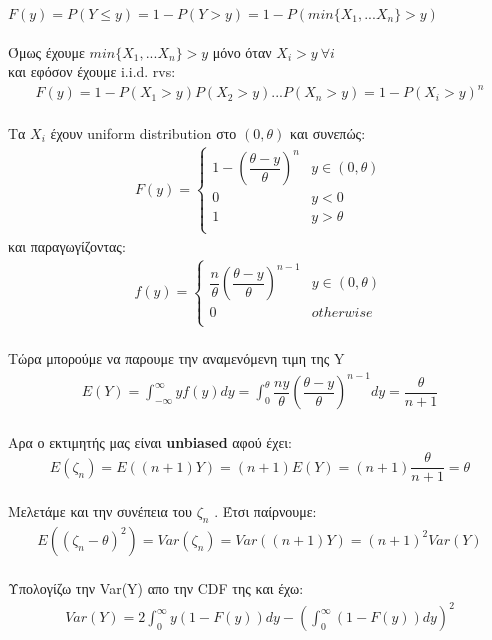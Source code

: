 \documentclass{article}
\begin{document}
$F(y)=P(Y\leq y)=1-P(Y>y)=1-P(min\lbrace X_{1},...X_{n} \rbrace > y)$
\\
\\
Όμως έχουμε $min\lbrace X_{1},...X_{n} \rbrace > y$ μόνο όταν $X_{i}>y ~ \forall i$ \\
και εφόσον έχουμε i.i.d. rvs:
\begin{align*}
F(y)=1-P(X_{1}>y)P(X_{2}>y)...P(X_{n}>y)=1-P(X_{i}>y)^{n}
\end{align*}
\\
Τα $X_{i}$ έχουν uniform distribution στο $(0,\theta)$ και συνεπώς:\\
\begin{align*}
F(y)=\left\{
\begin{array}{ll}
      1-\left(\dfrac{\theta-y}{\theta}\right)^{n} & y\in (0,\theta) \\
      0 & y<0\\
      1 & y>\theta\\
\end{array} 
\right. 
\end{align*}
και παραγωγίζοντας:\\
\begin{align*}
f(y)=\left\{
\begin{array}{ll}
      \dfrac{n}{\theta}\left(\dfrac{\theta-y}{\theta}\right)^{n-1} & y\in (0,\theta) \\
      0 & otherwise\\      
\end{array} 
\right. 
\end{align*}
\\
Τώρα μπορούμε να παρουμε την αναμενόμενη τιμη της Y \\
\begin{align*}
E(Y)=\int_{-\infty}^{\infty}yf(y)dy=\int_{0}^{\theta}\dfrac{ny}{\theta}\left(\dfrac{\theta-y}{\theta}\right)^{n-1}dy=\dfrac{\theta}{n+1}
\end{align*}
\\
Αρα ο εκτιμητής μας είναι \textbf{unbiased} αφού έχει:
\[ E(\zeta_{n})=E((n+1)Y)=(n+1)E(Y)=(n+1)\dfrac{\theta}{n+1}=\theta\]
\\
Μελετάμε και την συνέπεια του $\zeta_{n}$ . Έτσι παίρνουμε:
\begin{align*}
E((\zeta_{n}-\theta)^{2})=Var(\zeta_{n})=Var((n+1)Y)=(n+1)^{2}Var(Y)
\end{align*}
\\
Υπολογίζω την Var(Y) απο την CDF της και έχω:
\begin{align*}
Var(Y)=2\int_{0}^{\infty}y(1-F(y))dy-\left(\int_{0}^{\infty}(1-F(y))dy \right)^{2}
\end{align*}
\end{document}
